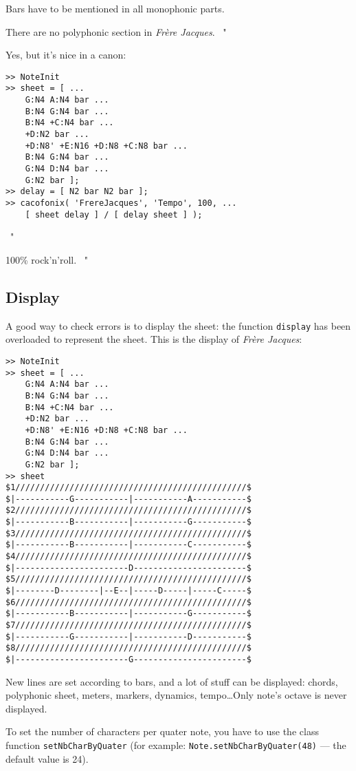 \documentclass{article}
\newcommand\frerejaques{\emph{Fr\`ere Jacques}\xspace}
\newenvironment{meenv}{ \par \noindent \makebox[6em][r]{ \textcolor{mecolor}{Me}: " --~}}{~"}
\newenvironment{myselfenv}{ \par \noindent \makebox[6em][r]{ \textcolor{myselfcolor}{Myself}: " --~}}{~"}
\newcommand{ \me }[1]{%
\begin{meenv}%
	#1%
\end{meenv} }
\begin{document}
Bars have to be mentioned in all monophonic parts.

\me{There are no polyphonic section in \frerejaques.}
\begin{myselfenv}%
Yes, but it's nice in a canon:

\begin{lstlisting}
>> NoteInit
>> sheet = [ ...
	G:N4 A:N4 bar ...
	B:N4 G:N4 bar ...
	B:N4 +C:N4 bar ...
	+D:N2 bar ...
	+D:N8' +E:N16 +D:N8 +C:N8 bar ...
	B:N4 G:N4 bar ...
	G:N4 D:N4 bar ...
	G:N2 bar ];
>> delay = [ N2 bar N2 bar ];
>> cacofonix( 'FrereJacques', 'Tempo', 100, ...
	[ sheet delay ] / [ delay sheet ] );
\end{lstlisting}%
\end{myselfenv}
\me{100\% rock'n'roll.}

\subsection{Display}

A good way to check errors is to display the sheet: the function \lstinline!display! has been overloaded to represent the sheet. This is the display of \frerejaques:
\begin{lstlisting}
>> NoteInit
>> sheet = [ ...
	G:N4 A:N4 bar ...
	B:N4 G:N4 bar ...
	B:N4 +C:N4 bar ...
	+D:N2 bar ...
	+D:N8' +E:N16 +D:N8 +C:N8 bar ...
	B:N4 G:N4 bar ...
	G:N4 D:N4 bar ...
	G:N2 bar ];
>> sheet
$1///////////////////////////////////////////////$
$|-----------G-----------|-----------A-----------$
$2///////////////////////////////////////////////$
$|-----------B-----------|-----------G-----------$
$3///////////////////////////////////////////////$
$|-----------B-----------|-----------C-----------$
$4///////////////////////////////////////////////$
$|-----------------------D-----------------------$
$5///////////////////////////////////////////////$
$|--------D--------|--E--|-----D-----|-----C-----$
$6///////////////////////////////////////////////$
$|-----------B-----------|-----------G-----------$
$7///////////////////////////////////////////////$
$|-----------G-----------|-----------D-----------$
$8///////////////////////////////////////////////$
$|-----------------------G-----------------------$
\end{lstlisting}

New lines are set according to bars, and a lot of stuff can be displayed: chords, polyphonic sheet, meters, markers, dynamics, tempo\dots Only note's octave is never displayed.

To set the number of characters per quater note, you have to use the class function \lstinline!setNbCharByQuater! (for example: \lstinline!Note.setNbCharByQuater(48)! --- the default value is 24).
\end{document}
